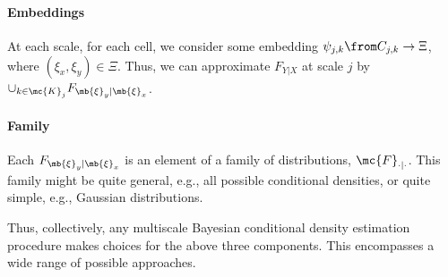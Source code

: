 \paragraph{Embeddings}
At each scale, for each cell, we consider some embedding $\psi_{j,k} \from C_{j,k} \to \Xi$, where $(\xi_x,\xi_y) \in \Xi$.  Thus, we can approximate $F_{Y|X}$ at scale $j$ by $\cup_{k \in \mc{K}_j} F_{\mb{\xi}_y| \mb{\xi}_x}$.   

\paragraph{Family} Each $F_{\mb{\xi}_y | \mb{\xi}_x}$ is an element of a family of distributions, $\mc{F}_{\cdot | \cdot}$.  This family might be quite general, e.g., all possible conditional densities, or quite simple, e.g., Gaussian distributions.


Thus, collectively, any multiscale Bayesian conditional density estimation procedure makes choices for the above three components.  This encompasses a wide range of possible approaches. 


